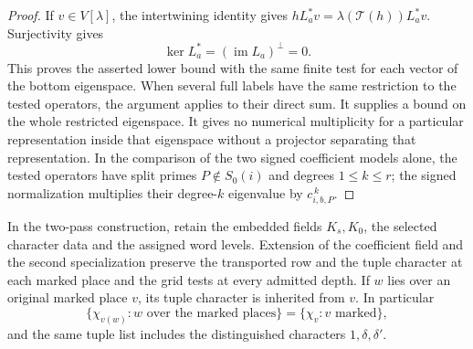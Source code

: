 \begin{proof}
If \(v\in V[\lambda]\), the intertwining identity gives
\(hL_a^*v=\lambda(\mathcal T(h))L_a^*v\). Surjectivity gives
\[
          \ker L_a^*=(\operatorname{im}L_a)^\perp=0 .
\]
This proves the asserted lower bound with the same finite test
for each vector of the bottom eigenspace. When several full labels
have the same restriction to the tested operators, the argument
applies to their direct sum. It supplies a bound on the whole
restricted eigenspace. It gives no numerical multiplicity for a
particular representation inside that eigenspace without a projector
separating that representation. In the comparison of the two signed
coefficient models alone, the tested operators have split primes
\(P\notin S_0(i)\) and degrees \(1\le k\le r\); the signed
normalization multiplies their degree-\(k\) eigenvalue by
\(c_{i,b,P}^{\,k}\).
\end{proof}

\begin{proposition}\label{prop:second-specialization-row}
In the two-pass construction, retain the embedded fields
\(K_s,K_0\), the selected character data and the assigned
word levels. Extension of the coefficient field and the second
specialization preserve the transported row and the tuple
character at each marked place and the grid tests at every
admitted depth. If \(w\) lies over an original marked place \(v\), its tuple character is inherited from \(v\). In particular
\[
 \{\chi_{v(w)}:w\text{ over the marked places}\}=\{\chi_v:v\text{ marked}\},
\]
and the same tuple list includes the distinguished characters \(1,\delta,\delta'\).
\end{proposition}

